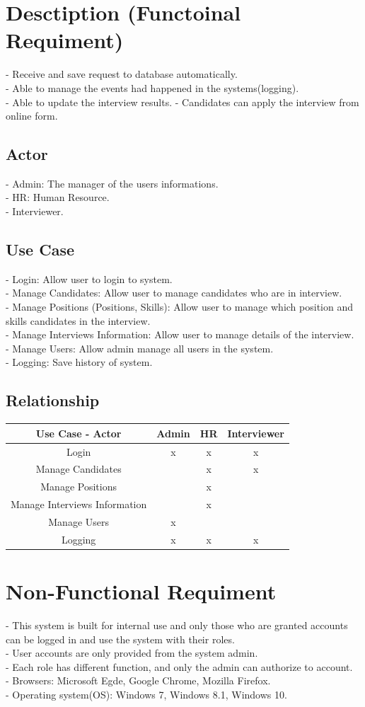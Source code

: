 \documentclass[a4paper]{article}
\begin{document}
\section{Desctiption (Functoinal Requiment)}
- Receive and save request to database automatically. \\
- Able to manage the events had happened in the systems(logging). \\
- Able to update the interview results.
- Candidates can apply the interview from online form.
\subsection{Actor}
- Admin: The manager of the users informations.\\
- HR: Human Resource.\\
- Interviewer.

\subsection{Use Case}
- Login: Allow user to login to system.\\
- Manage Candidates: Allow user to manage candidates who are in interview.\\
- Manage Positions (Positions, Skills): Allow user to manage which position and skills candidates in the interview.  \\
- Manage Interviews Information: Allow user to manage details of the interview.\\
- Manage Users: Allow admin manage all users in the system.\\
- Logging: Save history of system.
\subsection{Relationship}
\begin{tabular}{|c|c|c|c|}
\hline 
Use Case - Actor & Admin & HR & Interviewer\\ 
\hline 
Login & x & x & x\\ 
\hline 
Manage Candidates & & x & x\\
\hline
Manage Positions & & x & \\
\hline
Manage Interviews Information & & x & \\
\hline
Manage Users & x & & \\
\hline
Logging & x & x & x\\
\hline
\end{tabular}

\section{Non-Functional Requiment}
- This system is built for internal use and only those who are granted accounts can be logged in and use the system with their roles.\\
- User accounts are only provided from the system admin.\\
- Each role has different function, and only the admin can authorize to account.\\
- Browsers: Microsoft Egde, Google Chrome, Mozilla Firefox.\\
- Operating system(OS): Windows 7, Windows 8.1, Windows 10.
\end{document}
